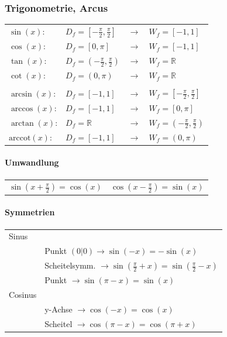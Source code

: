 			\subsubsection{Trigonometrie, Arcus}
			\begin{tabular}{llll}
			$\sin(x)$: & $D_f=[-\frac{\pi}{2},\frac{\pi}{2}]$ & $\rightarrow$ &  $W_f=[-1,1]$ \\
			$\cos(x)$: & $D_f=[0,\pi]$ & $\rightarrow$ &  $W_f=[-1,1]$  \\
			$\tan(x)$: & $D_f=(-\frac{\pi}{2},\frac{\pi}{2})$ & $\rightarrow$ & $W_f=\mathbb{R}$\\
			$\cot(x)$: & $D_f=(0,\pi)$ & $\rightarrow$ &  $W_f=\mathbb{R}$ \\
			\\
			$\arcsin(x)$: & $D_f=[-1,1] $ & $\rightarrow$ & $ W_f=[-\frac{\pi}{2},\frac{\pi}{2}]$ \\
			$\arccos(x)$: & $D_f=[-1,1]$ & $\rightarrow$ &  $W_f=[0,\pi]$ \\
			$\arctan(x)$: & $D_f=\mathbb{R}$ & $\rightarrow$ &  $W_f=(-\frac{\pi}{2},\frac{\pi}{2})$ \\
			$\mathrm{arccot}(x)$: & $D_f=[-1,1]$ & $\rightarrow$ &  $W_f=(0,\pi)$ \\		
			\end{tabular}


			\paragraph{Umwandlung}
			\begin{tabular}{ll}
			$\sin(x + \frac{\pi}{2}) = \cos(x)$ & $\cos(x - \frac{\pi}{2}) = \sin(x)$ \\	
			\end{tabular}
			
			
			\paragraph{Symmetrien} 
			\begin{tabular}{ll}
			 Sinus & \\
			  & Punkt $(0|0) \rightarrow \sin(-x) = - \sin(x)$ \\
			  & Scheitelsymm. $\rightarrow \sin(\frac{\pi}{2} + x) = \sin(\frac{\pi}{2} - x)$ \\
			  & Punkt $\rightarrow \sin(\pi - x) = \sin(x)$ \\
			  Cosinus & \\
			  & y-Achse $\rightarrow \cos(-x) = \cos(x)$ \\
			  & Scheitel $\rightarrow \cos(\pi - x) = \cos(\pi + x)$ \\		
			\end{tabular}
			
